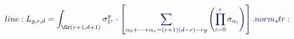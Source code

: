 \documentclass[12pt]{article}
\begin{document}
\makeatletter
\renewcommand*{\@textcolor}[3]{%
  \protect\leavevmode
  \begingroup
    \color#1{#2}#3%
  \endgroup
}
\makeatother
\begin{displaymath}
\mathcolor[RGB]{0,0,15}{line:
L_{g,r,d}=\int_{\Gr(r+1,d+1)}} \mathcolor[RGB]{0,0,30}{\sigma_{1^r}^g\cdot} \mathcolor[RGB]{0,0,45}{\left[} \mathcolor[RGB]{0,0,60}{\sum_{\alpha_0+\cdots+\alpha_r=(r+1)(d-r)-rg}\left(\prod_{i=0}^r} \mathcolor[RGB]{0,0,75}{\sigma_{\alpha_i}\right)\right].

norm_str:}
\end{displaymath}
\end{document}
